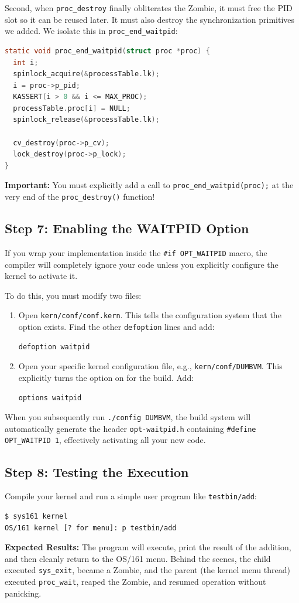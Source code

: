 Second, when \texttt{proc\_destroy} finally obliterates the Zombie, it must free the PID slot so it can be reused later. It must also destroy the synchronization primitives we added. We isolate this in \texttt{proc\_end\_waitpid}:
\begin{lstlisting}[language=C]
static void proc_end_waitpid(struct proc *proc) {
  int i;
  spinlock_acquire(&processTable.lk);
  i = proc->p_pid;
  KASSERT(i > 0 && i <= MAX_PROC);
  processTable.proc[i] = NULL;
  spinlock_release(&processTable.lk);

  cv_destroy(proc->p_cv);
  lock_destroy(proc->p_lock);
}
\end{lstlisting}
\textbf{Important:} You must explicitly add a call to \texttt{proc\_end\_waitpid(proc);} at the very end of the \texttt{proc\_destroy()} function!

\subsection{Step 7: Enabling the WAITPID Option}
If you wrap your implementation inside the \texttt{\#if OPT\_WAITPID} macro, the compiler will completely ignore your code unless you explicitly configure the kernel to activate it.

To do this, you must modify two files:
\begin{enumerate}
    \item Open \texttt{kern/conf/conf.kern}. This tells the configuration system that the option exists. Find the other \texttt{defoption} lines and add:
    \begin{verbatim}
defoption waitpid
    \end{verbatim}
    
    \item Open your specific kernel configuration file, e.g., \texttt{kern/conf/DUMBVM}. This explicitly turns the option on for the build. Add:
    \begin{verbatim}
options waitpid
    \end{verbatim}
\end{enumerate}

When you subsequently run \texttt{./config DUMBVM}, the build system will automatically generate the header \texttt{opt-waitpid.h} containing \texttt{\#define OPT\_WAITPID 1}, effectively activating all your new code.

\subsection{Step 8: Testing the Execution}
Compile your kernel and run a simple user program like \texttt{testbin/add}:
\begin{verbatim}
$ sys161 kernel
OS/161 kernel [? for menu]: p testbin/add
\end{verbatim}
\textbf{Expected Results:} The program will execute, print the result of the addition, and then cleanly return to the OS/161 menu. Behind the scenes, the child executed \texttt{sys\_exit}, became a Zombie, and the parent (the kernel menu thread) executed \texttt{proc\_wait}, reaped the Zombie, and resumed operation without panicking.

